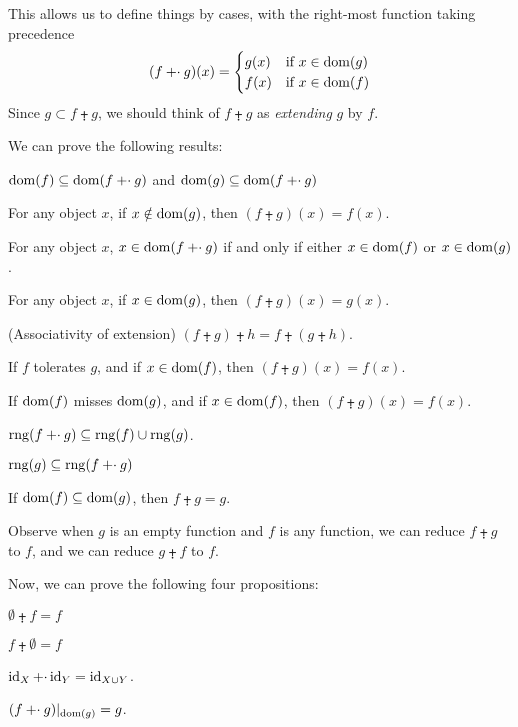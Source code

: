 \documentclass{article}
\begin{document}
\begin{remark}
This allows us to define things by cases, with the right-most function
taking precedence
\[(f\mathbin{\mathord{+}\cdot} g)(x)=\begin{cases}g(x) & \mbox{if }x\in\operatorname{dom}(g)\\
f(x) & \mbox{if }x\in\operatorname{dom}(f)
\end{cases}\]
Since $g\subset f\plusdot g$, we should think of $f\plusdot g$ as
\emph{extending} $g$ by $f$.
\end{remark}

We can prove the following results:
\begin{thm}
\item\label{funct4:10} $\operatorname{dom}(f)\subseteq\operatorname{dom}(f\mathbin{\mathord{+}\cdot} g)$
  and $\operatorname{dom}(g)\subseteq\operatorname{dom}(f\mathbin{\mathord{+}\cdot} g)$
\item\label{funct4:11} For any object $x$,
  if $x\notin\operatorname{dom}(g)$, then $(f\plusdot g)(x)=f(x)$.
\item\label{funct4:12} For any object $x$,
  $x\in\operatorname{dom}(f\mathbin{\mathord{+}\cdot} g)$ if and only if either $x\in\operatorname{dom}(f)$ or $x\in\operatorname{dom}(g)$.
\item\label{funct4:13} For any object $x$,
  if $x\in\operatorname{dom}(g)$, then $(f\plusdot g)(x)=g(x)$.
\item\label{funct4:14} (Associativity of extension)
  $(f\plusdot g)\plusdot h=f\plusdot(g\plusdot h)$.
\item\label{funct4:15} If $f$ tolerates $g$, and if $x\in\operatorname{dom}(f)$,
  then $(f\plusdot g)(x)=f(x)$.
\item\label{funct4:16} If $\operatorname{dom}(f)$ misses $\operatorname{dom}(g)$, and if $x\in\operatorname{dom}(f)$,
  then $(f\plusdot g)(x)=f(x)$.
\item\label{funct4:17} $\operatorname{rng}(f\mathbin{\mathord{+}\cdot} g)\subseteq\operatorname{rng}(f)\cup\operatorname{rng}(g)$.
\item\label{funct4:18} $\operatorname{rng}(g)\subseteq\operatorname{rng}(f\mathbin{\mathord{+}\cdot} g)$
\item\label{funct4:19} If $\operatorname{dom}(f)\subseteq\operatorname{dom}(g)$, then $f\plusdot g=g$.
\end{thm}

Observe when $g$ is an empty function and $f$ is any function, we can
reduce $f\plusdot g$ to $f$, and we can reduce $g\plusdot f$ to $f$.

Now, we can prove the following four propositions:
\begin{thm}
\item\label{funct4:20} $\emptyset\plusdot f=f$
\item\label{funct4:21} $f\plusdot\emptyset=f$
\item\label{funct4:22} $\operatorname{id}_{X}\mathbin{\mathord{+}\cdot}\operatorname{id}_{Y}=\operatorname{id}_{X\cup Y}$.
\item\label{funct4:23} $(f\mathbin{\mathord{+}\cdot} g)|_{\operatorname{dom}(g)}=g$.
\end{thm}
\end{document}
